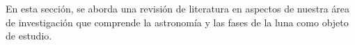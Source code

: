 En esta sección, se aborda una revisión de literatura en aspectos de
nuestra área de investigación que comprende la astronomía y las fases de la luna
como objeto de estudio.